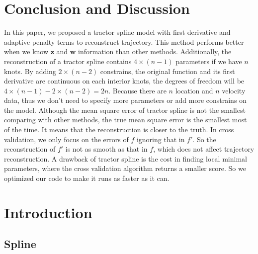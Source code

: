 \section{Conclusion and Discussion}
In this paper, we proposed a tractor spline model with first derivative and adaptive penalty terms to reconstruct trajectory. This method performs better when we know $\mathbf{z}$ and $\mathbf{w}$ information than other methods. Additionally, the reconstruction of a tractor spline contains $4\times (n-1)$ parameters if we have $n$ knots. By adding $2\times (n-2)$ constrains, the original function and its first derivative are continuous on each interior knots, the degrees of freedom will be $4\times (n-1)-2\times (n-2)=2n$. Because there are $n$ location and $n$ velocity data, thus we don't need to specify more parameters or add more constrains on the model. Although the mean square error of tractor spline is not the smallest comparing with other methods, the true mean square error is the smallest most of the time. It means that the reconstruction is closer to the truth. In cross validation, we only focus on the errors of $f$ ignoring that in $f'$. So the reconstruction of $f'$ is not as smooth as that in $f$, which does not affect trajectory reconstruction. A drawback of tractor spline is the cost in finding local minimal parameters, where the cross validation algorithm returns a smaller score. So we optimized our code to make it runs as faster as it can.








\section{Introduction}


\subsection{Spline}

